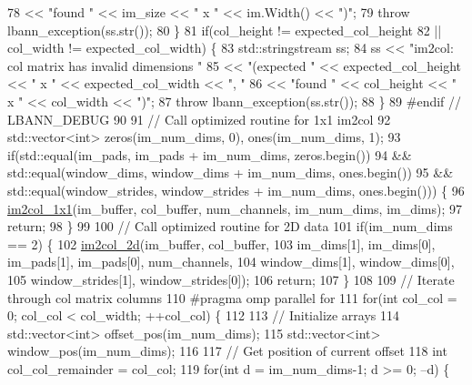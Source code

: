 \begin{DoxyCode}
78        << \textcolor{stringliteral}{"found "} << im\_size << \textcolor{stringliteral}{" x "} << im.Width() << \textcolor{stringliteral}{")"};
79     \textcolor{keywordflow}{throw} lbann\_exception(ss.str());
80   \}
81   \textcolor{keywordflow}{if}(col\_height != expected\_col\_height
82      || col\_width != expected\_col\_width) \{
83     std::stringstream ss;
84     ss << \textcolor{stringliteral}{"im2col: col matrix has invalid dimensions "}
85        << \textcolor{stringliteral}{"(expected "} << expected\_col\_height << \textcolor{stringliteral}{" x "} << expected\_col\_width << \textcolor{stringliteral}{", "}
86        << \textcolor{stringliteral}{"found "} << col\_height << \textcolor{stringliteral}{" x "} << col\_width << \textcolor{stringliteral}{")"};
87     \textcolor{keywordflow}{throw} lbann\_exception(ss.str());
88   \}
89 \textcolor{preprocessor}{  #endif // LBANN\_DEBUG  }
90 
91   \textcolor{comment}{// Call optimized routine for 1x1 im2col}
92   std::vector<int> zeros(im\_num\_dims, 0), ones(im\_num\_dims, 1);
93   \textcolor{keywordflow}{if}(std::equal(im\_pads, im\_pads + im\_num\_dims, zeros.begin())
94      && std::equal(window\_dims, window\_dims + im\_num\_dims, ones.begin())
95      && std::equal(window\_strides, window\_strides + im\_num\_dims, ones.begin())) \{
96     \hyperlink{namespacelbann_a3d099edd7d1b09889e0d2133bb83d5bf}{im2col\_1x1}(im\_buffer, col\_buffer, num\_channels, im\_num\_dims, im\_dims);
97     \textcolor{keywordflow}{return};
98   \}
99 
100   \textcolor{comment}{// Call optimized routine for 2D data}
101   \textcolor{keywordflow}{if}(im\_num\_dims == 2) \{
102     \hyperlink{namespacelbann_adc05d10657be77ccd9a74b1621c416c3}{im2col\_2d}(im\_buffer, col\_buffer,
103               im\_dims[1], im\_dims[0], im\_pads[1], im\_pads[0], num\_channels,
104               window\_dims[1], window\_dims[0],
105               window\_strides[1], window\_strides[0]);
106     \textcolor{keywordflow}{return};
107   \}
108 
109   \textcolor{comment}{// Iterate through col matrix columns}
110 \textcolor{preprocessor}{  #pragma omp parallel for}
111   \textcolor{keywordflow}{for}(\textcolor{keywordtype}{int} col\_col = 0; col\_col < col\_width; ++col\_col) \{
112 
113     \textcolor{comment}{// Initialize arrays}
114     std::vector<int> offset\_pos(im\_num\_dims);
115     std::vector<int> window\_pos(im\_num\_dims);
116 
117     \textcolor{comment}{// Get position of current offset}
118     \textcolor{keywordtype}{int} col\_col\_remainder = col\_col;
119     \textcolor{keywordflow}{for}(\textcolor{keywordtype}{int} d = im\_num\_dims-1; d >= 0; --d) \{

\end{DoxyCode}
